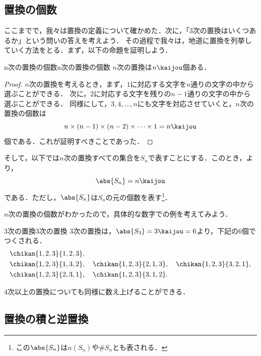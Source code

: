 \subsection{置換の個数}

ここまでで，我々は置換の定義について確かめた．次に，「$3$次の置換はいくつあるか」という問いの答えを考えよう．
その過程で我々は，地道に置換を列挙していく方法をとる．まず，以下の命題を証明しよう．

\begin{prop}{n次の置換の個数}{n次の置換の個数}
  $n$次の置換は$n\kaijou$個ある．
\end{prop}

\begin{leftbar}
\begin{proof}
  $n$次の置換を考えるとき，まず，$1$に対応する文字を$n$通りの文字の中から選ぶことができる．
  次に，$2$に対応する文字を残りの$n-1$通りの文字の中から選ぶことができる．
  同様にして，$3,4,\ldots,n$にも文字を対応させていくと，$n$次の置換の個数は
  \[
  n \times (n-1) \times (n-2) \times \cdots \times 1 = n\kaijou
  \]
  個である．これが証明すべきことであった．
\end{proof}
\end{leftbar}

そして，以下では$n$次の置換すべての集合を$S_n$で表すことにする．このとき，より，
\[
\abs{S_n} = n\kaijou
\]
である．ただし，$\abs{S_n}$は$S_n$の元の個数を表す\footnote{この$\abs{S_n}$は$n(S_n)$や$\# S_n$とも表される．}．

$n$次の置換の個数がわかったので，具体的な数字での例を考えてみよう．

\begin{example}{3次の置換}{3次の置換}
  3次の置換は，$\abs{S_3} = 3\kaijou = 6$より，下記の$6$個でつくされる．
  \begin{align*}
    &\chikan{1, 2, 3}{1, 2, 3}, \\
    &\chikan{1, 2, 3}{1, 3, 2}, \quad
    \chikan{1, 2, 3}{2, 1, 3},\quad 
    \chikan{1, 2, 3}{3, 2, 1}, \\
    &\chikan{1, 2, 3}{2, 3, 1},\quad 
    \chikan{1, 2, 3}{3, 1, 2}.
  \end{align*}
\end{example}

$4$次以上の置換についても同様に数え上げることができる．

\subsection{置換の積と逆置換}

